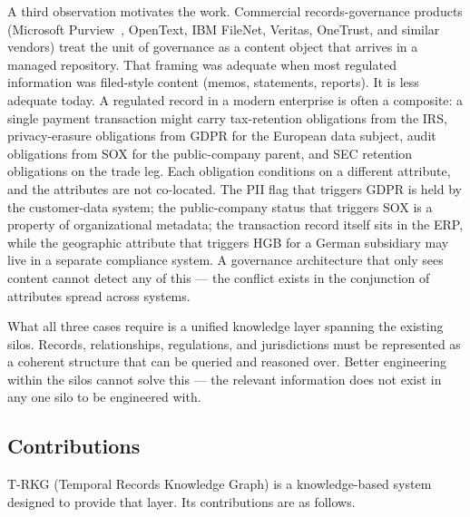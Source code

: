 \documentclass{ieeeaccess}
\begin{document}
A third observation motivates the work. Commercial records-governance products (Microsoft Purview~\cite{purview}, OpenText, IBM FileNet, Veritas, OneTrust, and similar vendors) treat the unit of governance as a content object that arrives in a managed repository. That framing was adequate when most regulated information was filed-style content (memos, statements, reports). It is less adequate today. A regulated record in a modern enterprise is often a composite: a single payment transaction might carry tax-retention obligations from the IRS, privacy-erasure obligations from GDPR for the European data subject, audit obligations from SOX for the public-company parent, and SEC retention obligations on the trade leg. Each obligation conditions on a different attribute, and the attributes are not co-located. The PII flag that triggers GDPR is held by the customer-data system; the public-company status that triggers SOX is a property of organizational metadata; the transaction record itself sits in the ERP, while the geographic attribute that triggers HGB for a German subsidiary may live in a separate compliance system. A governance architecture that only sees content cannot detect any of this — the conflict exists in the conjunction of attributes spread across systems.

What all three cases require is a unified knowledge layer spanning the existing silos. Records, relationships, regulations, and jurisdictions must be represented as a coherent structure that can be queried and reasoned over. Better engineering within the silos cannot solve this --- the relevant information does not exist in any one silo to be engineered with.

\subsection{Contributions}

T-RKG (Temporal Records Knowledge Graph) is a knowledge-based system designed to provide that layer. Its contributions are as follows.
\end{document}
